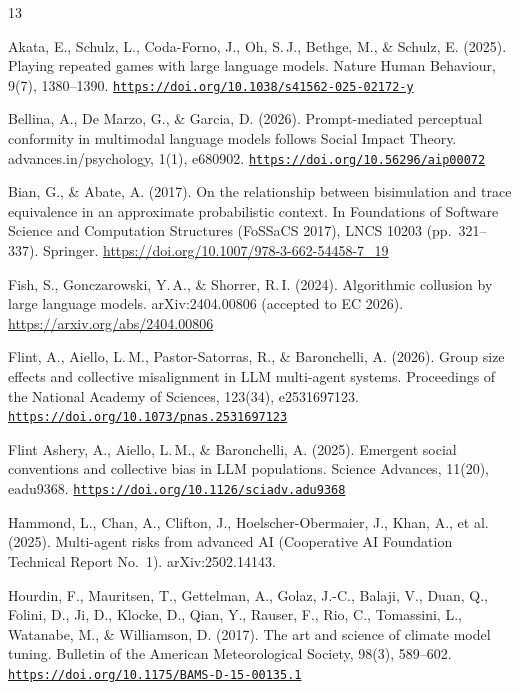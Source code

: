 \documentclass[11pt,letterpaper]{article}
\newcommand{\doi}[1]{\href{https://doi.org/#1}{\nolinkurl{https://doi.org/#1}}}
\begin{document}
\clearpage
\begin{thebibliography}{13}

Akata, E., Schulz, L., Coda-Forno, J., Oh, S.\,J., Bethge, M., \& Schulz, E. (2025).
Playing repeated games with large language models.
Nature Human Behaviour, 9(7), 1380--1390.
\doi{10.1038/s41562-025-02172-y}

Bellina, A., De Marzo, G., \& Garcia, D. (2026).
Prompt-mediated perceptual conformity in multimodal language models follows Social Impact Theory.
advances.in/psychology, 1(1), e680902.
\doi{10.56296/aip00072}

Bian, G., \& Abate, A. (2017).
On the relationship between bisimulation and trace equivalence in an approximate probabilistic context.
In Foundations of Software Science and Computation Structures (FoSSaCS 2017), LNCS 10203 (pp.~321--337). Springer.
\url{https://doi.org/10.1007/978-3-662-54458-7_19}

Fish, S., Gonczarowski, Y.\,A., \& Shorrer, R.\,I. (2024).
Algorithmic collusion by large language models.
arXiv:2404.00806 (accepted to EC 2026).
\url{https://arxiv.org/abs/2404.00806}

Flint, A., Aiello, L.\,M., Pastor-Satorras, R., \& Baronchelli, A. (2026).
Group size effects and collective misalignment in LLM multi-agent systems.
Proceedings of the National Academy of Sciences, 123(34), e2531697123.
\doi{10.1073/pnas.2531697123}

Flint Ashery, A., Aiello, L.\,M., \& Baronchelli, A. (2025).
Emergent social conventions and collective bias in LLM populations.
Science Advances, 11(20), eadu9368.
\doi{10.1126/sciadv.adu9368}

Hammond, L., Chan, A., Clifton, J., Hoelscher-Obermaier, J., Khan, A., et al. (2025).
Multi-agent risks from advanced AI (Cooperative AI Foundation Technical Report No.~1).
arXiv:2502.14143.

Hourdin, F., Mauritsen, T., Gettelman, A., Golaz, J.-C., Balaji, V., Duan, Q., Folini, D., Ji, D., Klocke, D., Qian, Y., Rauser, F., Rio, C., Tomassini, L., Watanabe, M., \& Williamson, D. (2017).
The art and science of climate model tuning.
Bulletin of the American Meteorological Society, 98(3), 589--602.
\doi{10.1175/BAMS-D-15-00135.1}


\end{thebibliography}
\end{document}
